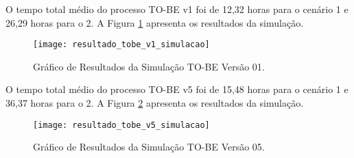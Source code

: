 O tempo total médio do processo TO-BE v1 foi de 12,32 horas para o cenário 1 e 26,29 horas para o 2. A Figura \ref{fig:resultadostobevum} apresenta os resultados da simulação.
\begin{figure}[H]
	\centering
	\texttt{[image: resultado\_tobe\_v1\_simulacao]}
	\caption[Gráfico de Resultados da Simulação TO-BE Versão 01]{Gráfico de Resultados da Simulação TO-BE Versão 01.}
	\label{fig:resultadostobevum}
\end{figure}
O tempo total médio do processo TO-BE v5 foi de 15,48 horas para o cenário 1 e 36,37 horas para o 2. A Figura \ref{fig:resultadostobevcinco} apresenta os resultados da simulação.
\begin{figure}[H]
	\centering
	\texttt{[image: resultado\_tobe\_v5\_simulacao]}
	\caption[Gráfico de Resultados da Simulação TO-BE Versão 05]{Gráfico de Resultados da Simulação TO-BE Versão 05.}
	\label{fig:resultadostobevcinco}
\end{figure}
